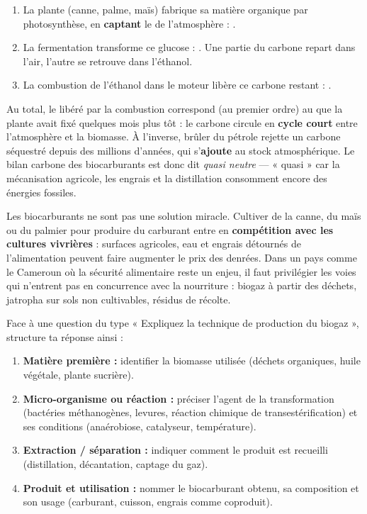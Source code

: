 \documentclass[11pt]{article}
\begin{document}
\begin{enumerate}
\item La plante (canne, palme, maïs) fabrique sa matière organique par photosynthèse, en \textbf{captant} le  de l'atmosphère : .
\item La fermentation transforme ce glucose : . Une partie du carbone repart dans l'air, l'autre se retrouve dans l'éthanol.
\item La combustion de l'éthanol dans le moteur libère ce carbone restant : .
\end{enumerate}

Au total, le  libéré par la combustion correspond (au premier ordre) au  que la plante avait fixé quelques mois plus tôt : le carbone circule en \textbf{cycle court} entre l'atmosphère et la biomasse. À l'inverse, brûler du pétrole rejette un carbone séquestré depuis des millions d'années, qui s'\textbf{ajoute} au stock atmosphérique. Le bilan carbone des biocarburants est donc dit \emph{quasi neutre} — « quasi » car la mécanisation agricole, les engrais et la distillation consomment encore des énergies fossiles.

\begin{attention}
Les biocarburants ne sont pas une solution miracle. Cultiver de la canne, du maïs ou du palmier pour produire du carburant entre en \textbf{compétition avec les cultures vivrières} : surfaces agricoles, eau et engrais détournés de l'alimentation peuvent faire augmenter le prix des denrées. Dans un pays comme le Cameroun où la sécurité alimentaire reste un enjeu, il faut privilégier les voies qui n'entrent pas en concurrence avec la nourriture : biogaz à partir des déchets, jatropha sur sols non cultivables, résidus de récolte.
\end{attention}

\begin{methode}
Face à une question du type « Expliquez la technique de production du biogaz », structure ta réponse ainsi :
\begin{enumerate}
\item \textbf{Matière première :} identifier la biomasse utilisée (déchets organiques, huile végétale, plante sucrière).
\item \textbf{Micro-organisme ou réaction :} préciser l'agent de la transformation (bactéries méthanogènes, levures, réaction chimique de transestérification) et ses conditions (anaérobiose, catalyseur, température).
\item \textbf{Extraction / séparation :} indiquer comment le produit est recueilli (distillation, décantation, captage du gaz).
\item \textbf{Produit et utilisation :} nommer le biocarburant obtenu, sa composition et son usage (carburant, cuisson, engrais comme coproduit).
\end{enumerate}
\end{methode}
\end{document}
